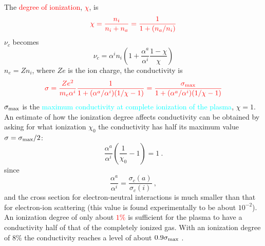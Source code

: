 \documentclass[12pt,a4paper]{article}
\begin{document}
The \textcolor{red}{degree of ionization}, \textcolor{red}{$\chi$}, is
\begin{equation*}
\color{red} \chi = \frac{n_i}{n_i +n_a} = \frac{1}{1+(n_a/n_i)}
\end{equation*}
$\nu_c$ becomes
\begin{equation*}
\nu_c = \alpha^i n_i \left(1+ \frac{\alpha^a}{\alpha^i} \frac{1-\chi}{\chi} \right)
\end{equation*}
$n_e = Z n_i$, where $Ze$ is the ion charge, the conductivity is
\begin{equation*}
\color{red} \sigma = \frac{Ze^2}{m_e \alpha^i} \frac{1}{1+(\alpha^a/\alpha^i)(1/\chi -1)} = \frac{\sigma_{\rm max}}{1+(\alpha^a/\alpha^i)(1/\chi -1)}
\end{equation*}
\textcolor{cyan}{$\sigma_{\rm max}$} is the \textcolor{cyan}{maximum conductivity at complete ionization of the plasma}, $\chi = 1$. An estimate of how the ionization degree affects conductivity can be obtained by asking for what ionization $\chi_0$ the conductivity has half its maximum value $\sigma = \sigma_{\rm max} /2$:
\begin{equation*}
\frac{\alpha^a}{\alpha^i} \left(\frac{1}{\chi_0} -1 \right) = 1 ~.
\end{equation*}
since
\begin{equation*}
\frac{\alpha^a}{\alpha^i} = \frac{\sigma_c(a)}{\sigma_c(i)} ~,
\end{equation*}
and the cross section for electron-neutral interactions is much smaller than that for electron-ion scattering (this value is found experimentally to be about $10^{-2}$). An ionization degree of only about \textcolor{red}{$1\%$} is sufficient for the plasma to have a conductivity half of that of the completely ionized gas. With an ionization degree of $8 \%$ the conductivity reaches a level of about $0.9 \sigma_{\rm max}$ .
\end{document}
